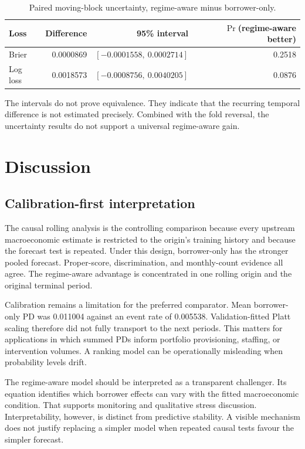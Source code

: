 \documentclass[12pt]{article}
\begin{document}
\begin{table}[htbp]
\centering
\caption{Paired moving-block uncertainty, regime-aware minus borrower-only.}
\label{tab:uncertainty}
\small
\begin{tabular}{L{0.20\textwidth}rrr}
\toprule
Loss & Difference & 95\% interval & $\Pr$(regime-aware better) \\
\midrule
Brier & 0.0000869 & $[-0.0001558,\ 0.0002714]$ & 0.2518 \\
Log loss & 0.0018573 & $[-0.0008756,\ 0.0040205]$ & 0.0876 \\
\bottomrule
\end{tabular}
\end{table}

The intervals do not prove equivalence. They indicate that the recurring temporal difference is not estimated precisely. Combined with the fold reversal, the uncertainty results do not support a universal regime-aware gain.

\section{Discussion}

\subsection{Calibration-first interpretation}

The causal rolling analysis is the controlling comparison because every upstream macroeconomic estimate is restricted to the origin's training history and because the forecast test is repeated. Under this design, borrower-only has the stronger pooled forecast. Proper-score, discrimination, and monthly-count evidence all agree. The regime-aware advantage is concentrated in one rolling origin and the original terminal period.

Calibration remains a limitation for the preferred comparator. Mean borrower-only PD was 0.011004 against an event rate of 0.005538. Validation-fitted Platt scaling therefore did not fully transport to the next periods. This matters for applications in which summed PDs inform portfolio provisioning, staffing, or intervention volumes. A ranking model can be operationally misleading when probability levels drift.

The regime-aware model should be interpreted as a transparent challenger. Its equation identifies which borrower effects can vary with the fitted macroeconomic condition. That supports monitoring and qualitative stress discussion. Interpretability, however, is distinct from predictive stability. A visible mechanism does not justify replacing a simpler model when repeated causal tests favour the simpler forecast.
\end{document}

